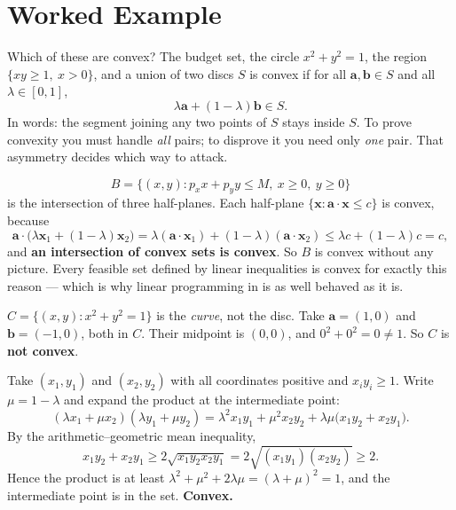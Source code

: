 \section{Worked Example}

\begin{worked}{Which of these are convex? The budget set, the circle $x^{2}+y^{2}=1$, the region $\{xy\ge1,\ x>0\}$, and a union of two discs}
$S$ is convex if for all $\mathbf a,\mathbf b\in S$ and all
$\lambda\in[0,1]$,
\[
  \lambda\mathbf a+(1-\lambda)\mathbf b\in S .
\]
In words: the segment joining any two points of $S$ stays inside $S$. To
prove convexity you must handle \emph{all} pairs; to disprove it you need
only \emph{one} pair. That asymmetry decides which way to attack.

\[
  B=\{(x,y):p_{x}x+p_{y}y\le M,\ x\ge0,\ y\ge0\}
\]
is the intersection of three half-planes. Each half-plane
$\{\mathbf x:\mathbf a\cdot\mathbf x\le c\}$ is convex, because
\[
  \mathbf a\cdot\bigl(\lambda\mathbf x_{1}+(1-\lambda)\mathbf x_{2}\bigr)
  =\lambda(\mathbf a\cdot\mathbf x_{1})+(1-\lambda)(\mathbf a\cdot\mathbf x_{2})
  \le\lambda c+(1-\lambda)c=c ,
\]
and \textbf{an intersection of convex sets is convex}. So $B$ is convex
without any picture. Every feasible set defined by linear inequalities is
convex for exactly this reason --- which is why linear programming in
 is as well behaved as it is.

$C=\{(x,y):x^{2}+y^{2}=1\}$ is the \emph{curve}, not the disc. Take
$\mathbf a=(1,0)$ and $\mathbf b=(-1,0)$, both in $C$. Their midpoint is
$(0,0)$, and $0^{2}+0^{2}=0\neq1$. So $C$ is \textbf{not convex}.

Take $(x_{1},y_{1})$ and $(x_{2},y_{2})$ with all coordinates positive and
$x_{i}y_{i}\ge1$. Write $\mu=1-\lambda$ and expand the product at the
intermediate point:
\[
  (\lambda x_{1}+\mu x_{2})(\lambda y_{1}+\mu y_{2})
  =\lambda^{2}x_{1}y_{1}+\mu^{2}x_{2}y_{2}+\lambda\mu\bigl(x_{1}y_{2}+x_{2}y_{1}\bigr).
\]
By the arithmetic--geometric mean inequality,
\[
  x_{1}y_{2}+x_{2}y_{1}\ge2\sqrt{x_{1}y_{2}x_{2}y_{1}}
  =2\sqrt{(x_{1}y_{1})(x_{2}y_{2})}\ge2 .
\]
Hence the product is at least
$\lambda^{2}+\mu^{2}+2\lambda\mu=(\lambda+\mu)^{2}=1$, and the intermediate
point is in the set. \textbf{Convex.} \checkmark


\end{worked}
